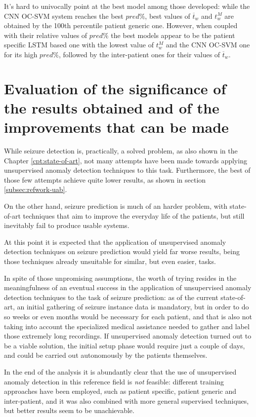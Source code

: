 It's hard to univocally point at the best model among those developed: while the \gls{CNN} \gls{OC-SVM} system reaches the best $pred\%$, best values of  $\overline{t}_w$ and $t_w^M$ are obtained by the 100th percentile patient generic one. However, when coupled with their relative values of $pred\%$ the best models appear to be the patient specific \gls{LSTM} based one with the lowest value of $t_w^M$ and the \gls{CNN} \gls{OC-SVM} one for its high $pred\%$, followed by the inter-patient ones for their values of $\overline{t}_w$.

\section{Evaluation of the significance of the results obtained and of the improvements that can be made}
While seizure detection is, practically, a solved problem, as also shown in the Chapter \ref{cpt:state-of-art}, not many attempts have been made towards applying unsupervised anomaly detection techniques to this task. Furthermore, the best of those few attempts achieve quite lower results, as shown in section \ref{subsec:refwork-uab}.

On the other hand, seizure prediction is much of an harder problem, with state-of-art techniques that aim to improve the everyday life of the patients, but still inevitably fail to produce usable systems.

At this point it is expected that the application of unsupervised anomaly detection techniques on seizure prediction would yield far worse results, being those techniques already unsuitable for similar, but even easier, tasks.

In spite of those unpromising assumptions, the worth of trying resides in the meaningfulness of an eventual success in the application of unsupervised anomaly detection techniques to the task of seizure prediction: as of the current state-of-art, an initial gathering of seizure instance data is mandatory, but in order to do so weeks or even months would be necessary for each patient, and that is also not taking into account the specialized medical assistance needed to gather and label those extremely long recordings. If unsupervised anomaly detection turned out to be a viable solution, the initial setup phase would require just a couple of days, and could be carried out autonomously by the patients themselves.

In the end of the analysis it is abundantly clear that the use of unsupervised anomaly detection in this reference field is \textit{not} feasible: different training approaches have been employed, such as patient specific, patient generic and inter-patient, and it was also combined with more general supervised techniques, but better results seem to be unachievable.

